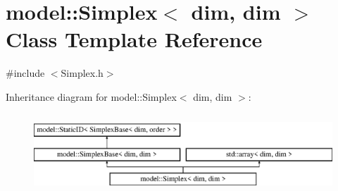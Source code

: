 \hypertarget{classmodel_1_1_simplex_3_01dim_00_01dim_01_4}{}\section{model\+:\+:Simplex$<$ dim, dim $>$ Class Template Reference}
\label{classmodel_1_1_simplex_3_01dim_00_01dim_01_4}


{\ttfamily \#include $<$Simplex.\+h$>$}

Inheritance diagram for model\+:\+:Simplex$<$ dim, dim $>$\+:\begin{figure}[H]
\begin{center}
\leavevmode
\includegraphics[height=3.000000cm]{classmodel_1_1_simplex_3_01dim_00_01dim_01_4}
\end{center}
\end{figure}
